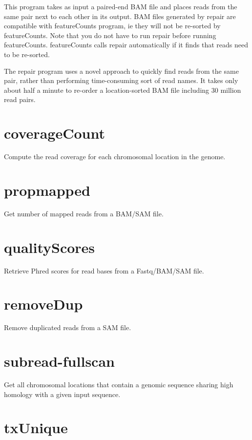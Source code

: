 \documentclass[12pt]{report}
\newcommand{\featureCounts}{\textsf{featureCounts}}
\newcommand{\repair}{\textsf{repair}}
\begin{document}
This program takes as input a paired-end BAM file and places reads from the same pair next to each other in its output.
BAM files generated by {\repair} are compatible with {\featureCounts} program, ie they will not be re-sorted by {\featureCounts}.
Note that you do not have to run {\repair} before running {\featureCounts}.
{\featureCounts} calls {\repair} automatically if it finds that reads need to be re-sorted.

The {\repair} program uses a novel approach to quickly find reads from the same pair, rather than performing time-consuming sort of read names.
It takes only about half a minute to re-order a location-sorted BAM file including 30 million read pairs.

\section{coverageCount}

Compute the read coverage for each chromosomal location in the genome.

\section{propmapped}

Get number of mapped reads from a BAM/SAM file.

\section{qualityScores}

Retrieve Phred scores for read bases from a Fastq/BAM/SAM file.

\section{removeDup}

Remove duplicated reads from a SAM file.

\section{subread-fullscan}

Get all chromosomal locations that contain a genomic sequence sharing high homology with a given input sequence.

\section{txUnique}
\end{document}
